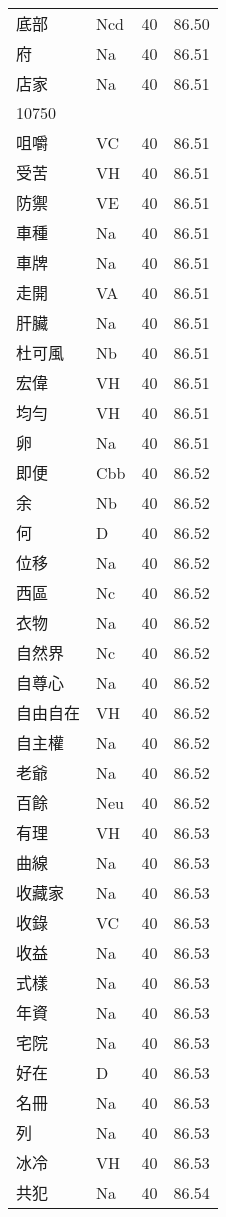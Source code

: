 \documentclass[twocolumn]{book}
\begin{document}
\begin{supertabular}{llrr}
底部 & Ncd & 40 &  86.50\\
府 & Na & 40 &  86.51\\
店家 & Na & 40 &  86.51\\
10750\\
咀嚼 & VC & 40 &  86.51\\
受苦 & VH & 40 &  86.51\\
防禦 & VE & 40 &  86.51\\
車種 & Na & 40 &  86.51\\
車牌 & Na & 40 &  86.51\\
走開 & VA & 40 &  86.51\\
肝臟 & Na & 40 &  86.51\\
杜可風 & Nb & 40 &  86.51\\
宏偉 & VH & 40 &  86.51\\
均勻 & VH & 40 &  86.51\\
卵 & Na & 40 &  86.51\\
即便 & Cbb & 40 &  86.52\\
余 & Nb & 40 &  86.52\\
何 & D & 40 &  86.52\\
位移 & Na & 40 &  86.52\\
西區 & Nc & 40 &  86.52\\
衣物 & Na & 40 &  86.52\\
自然界 & Nc & 40 &  86.52\\
自尊心 & Na & 40 &  86.52\\
自由自在 & VH & 40 &  86.52\\
自主權 & Na & 40 &  86.52\\
老爺 & Na & 40 &  86.52\\
百餘 & Neu & 40 &  86.52\\
有理 & VH & 40 &  86.53\\
曲線 & Na & 40 &  86.53\\
收藏家 & Na & 40 &  86.53\\
收錄 & VC & 40 &  86.53\\
收益 & Na & 40 &  86.53\\
式樣 & Na & 40 &  86.53\\
年資 & Na & 40 &  86.53\\
宅院 & Na & 40 &  86.53\\
好在 & D & 40 &  86.53\\
名冊 & Na & 40 &  86.53\\
列 & Na & 40 &  86.53\\
冰冷 & VH & 40 &  86.53\\
共犯 & Na & 40 &  86.54\\

\end{supertabular}
\end{document}
